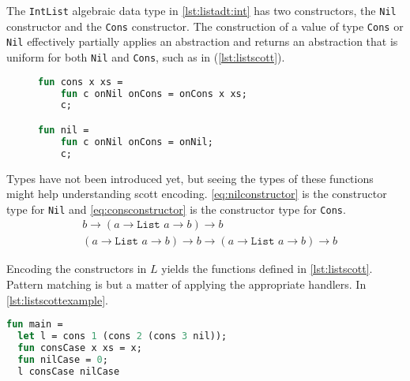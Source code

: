 \documentclass[11pt,oneside,a4paper]{report}
\begin{document}
\begin{exmp}
    The \texttt{IntList} algebraic data type in \autoref{lst:listadt:int} has two constructors, the \texttt{Nil} constructor and the \texttt{Cons} constructor.
    The construction of a value of type \texttt{Cons} or \texttt{Nil} effectively partially applies an abstraction and returns an abstraction that is uniform for both \texttt{Nil} and \texttt{Cons}, such as in (\autoref{lst:listscott}).
\begin{figure}
\begin{lstlisting}[language=ML,caption={List algebraic data type implementation},label={lst:listscott}]
fun cons x xs = 
    fun c onNil onCons = onCons x xs;
    c;

fun nil = 
    fun c onNil onCons = onNil;
    c;
\end{lstlisting}
\end{figure}

Types have not been introduced yet, but seeing the types of these functions might help understanding scott encoding.
\autoref{eq:nilconstructor} is the constructor type for \texttt{Nil} and \autoref{eq:consconstructor} is the constructor type for \texttt{Cons}.
\begin{align}
   &b \rightarrow (a \rightarrow \texttt{List } a \rightarrow b) \rightarrow b
   \label{eq:nilconstructor}\\
   &(a \rightarrow \texttt{List } a \rightarrow b) \rightarrow b \rightarrow (a \rightarrow \texttt{List } a \rightarrow b) \rightarrow b
   \label{eq:consconstructor}
\end{align}

Encoding the constructors in $L$ yields the functions defined in \autoref{lst:listscott}.
Pattern matching is but a matter of applying the appropriate handlers.
In \autoref{lst:listscottexample}.
\begin{lstlisting}[language=ML,caption={Example of scott encoded list algebraic data type},label={lst:listscottexample}]
fun main =
  let l = cons 1 (cons 2 (cons 3 nil));
  fun consCase x xs = x;
  fun nilCase = 0;
  l consCase nilCase
\end{lstlisting}
\end{exmp}
\end{document}
